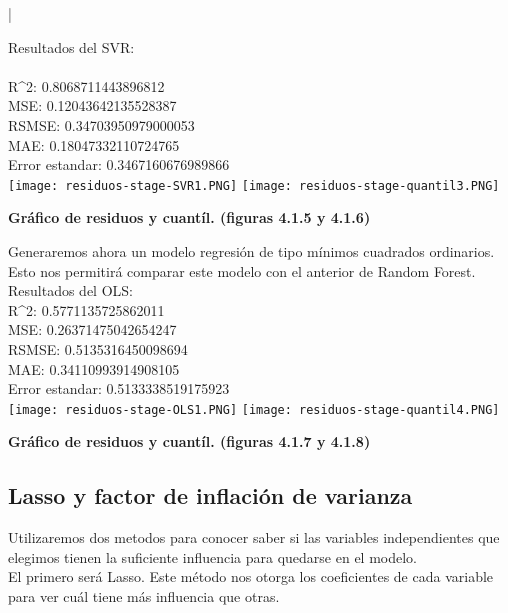 |\documentclass{article}
\begin{document}
    Resultados del SVR:\\
    \\
    {R^2}:  0.8068711443896812\\
    MSE:  0.12043642135528387\\
    RSMSE:  0.34703950979000053\\
    MAE:  0.18047332110724765\\
    Error estandar:  0.3467160676989866\\


        \texttt{[image: residuos-stage-SVR1.PNG]} 
        \texttt{[image: residuos-stage-quantil3.PNG]} \\
        \begin{center}
            \textbf{Gráfico de residuos y cuantíl. (figuras 4.1.5 y 4.1.6)}
        \end{center}


Generaremos ahora un modelo regresión de tipo mínimos cuadrados ordinarios. Esto nos permitirá comparar este modelo con el anterior de Random Forest.\\

Resultados del OLS:\\
{R^{2}}:  0.5771135725862011\\
MSE:  0.26371475042654247\\
RSMSE:  0.5135316450098694\\
MAE:  0.34110993914908105\\
Error estandar:  0.5133338519175923\\


        \texttt{[image: residuos-stage-OLS1.PNG]} 
        \texttt{[image: residuos-stage-quantil4.PNG]} \\
        \begin{center}
            \textbf{Gráfico de residuos y cuantíl. (figuras 4.1.7 y 4.1.8)}\\
        \end{center}

\subsection{Lasso y  factor de inflación de varianza}

Utilizaremos dos metodos para conocer saber si las variables independientes que elegimos tienen la suficiente influencia para quedarse en el modelo.\\

El primero será Lasso. Este método nos otorga los coeficientes de cada variable para ver cuál tiene más influencia que otras.\\
\end{document}
